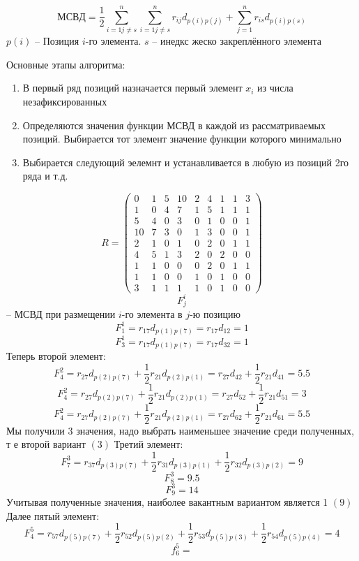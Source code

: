 \documentclass{article}
\begin{document}
	$$
	МСВД = \frac{1}{2} \sum\limits_{i = 1 j \ne s}^{n}\sum\limits_{i = 1 j \ne s}^{n} r_{ij} d_{p(i) p (j)} + \sum\limits_{j=1}^{n} r_{is} d_{p(i) p(s)}
	$$
	$p(i)$ -- Позиция $i$-го элемента. $s$ -- инедкс жеско закреплённого элемента

	Основные этапы алгоритма:
	\begin{enumerate}
		\item В первый ряд позиций назначается первый элемент $x_i$ из числа незафиксированных
		\item Определяются значения функции МСВД в каждой из рассматриваемых позиций. Выбирается тот элемент значение функции которого минимально
		\item Выбирается следующий эелемнт и устанавливается в любую из позиций 2го ряда
		и т.д.
	\end{enumerate}

	$$
	R =
	\begin{pmatrix}
		0 & 1 & 5 & 10 & 2 & 4 & 1 & 1 & 3\\
		1 & 0 & 4 & 7 & 1 & 5 & 1 & 1 & 1 \\
		5 & 4 & 0 & 3 & 0 & 1 & 0 & 0 & 1\\
		10 & 7 & 3 & 0 & 1 & 3 & 0 & 0 & 1\\
		2 & 1 & 0 & 1 & 0 & 2 & 0 & 1 & 1\\
		4 & 5 & 1 & 3 & 2 & 0 & 2 & 0 & 0\\
		1 & 1 & 0 & 0 & 0 & 2 & 0 & 1 & 1\\
		1 & 1 & 0 & 0 & 1 & 0 & 1 & 0 & 0\\
		3 & 1 & 1 & 1 & 1 & 0 & 1 & 0 & 0
	\end{pmatrix}
	$$
	$$
	F_j^i
	$$ -- МСВД при размещении $i$-го элемента в $j$-ю позицию
	$$
	F_1^1 = r_{17}d_{p(1) p(7)} = r_{17} d_{12} = 1
	$$
	$$
	F_3^1 = r_{17}d_{p(1) p(7)} = r_{17}d_{32} = 1
	$$
	Теперь второй элемент:
	$$
	F_4^2 = r_{27}d_{p(2) p(7)} + \frac{1}{2}  r_{21} d_{p(2) p(1)} = r_{27}d_{42} + \frac{1}{2} r_{21} d_{41} = 5.5
	$$
	$$
	F_4^2 = r_{27}d_{p(2) p(7)} + \frac{1}{2}  r_{21} d_{p(2) p(1)} = r_{27} d_{52} + \frac{1}{2} r_{21} d_{51} = 3
	$$
	$$
	F_4^2 = r_{27}d_{p(2) p(7)} + \frac{1}{2}  r_{21} d_{p(2) p(1)} = r_{27} d_{62} + \frac{1}{2} r_{21} d_{61} = 5.5
	$$
	Мы получили 3 значения, надо выбрать наименьшее значение среди полученных, т е второй вариант $(3)$
	Третий элемент:
	$$
	F_7^3 = r_{37} d_{p(3) p(7)} + \frac{1}{2} r_{31}d_{p(3) p(1)} + \frac{1}{2}  r_{32} d_{p(3) p(2)} = 9
	$$
	$$
	F_8^3 = 9.5
	$$
	$$
	F_9^3 = 14
	$$
	Учитывая полученные значения, наиболее вакантным вариантом является 1 $(9)$
	Далее пятый элемент:
	$$
	F_4^5 = r_{57} d_{p(5)p(7)} + \frac{1}{2} r_{52} d_{p(5) p (2)} + \frac{1}{2} r_{53} d_{p(5) p(3)} + \frac{1}{2} r_{54} d_{p(5) p(4)} = 4
	$$
	$$
	f_6^5 = 
	$$
\end{document}
